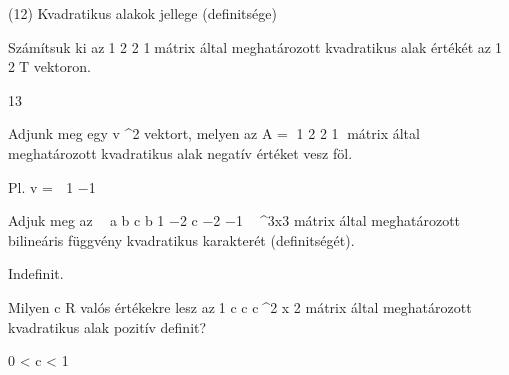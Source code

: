 \begin{frame}[plain]
\begin{tcolorbox}[center, colback={myyellow}, coltext={black}, colframe={myyellow}]
    {\RHuge  (12) Kvadratikus alakok jellege (deﬁnitsége)}
    \mmedskip
\end{tcolorbox}
\end{frame}

\begin{frame}
  \begin{tcolorbox}[title={12/1. -N-}]
     Számítsuk ki az1 2 2 1mátrix által meghatározott kvadratikus alak értékét az1 2T vektoron.

  \tcblower

    \mmedskip 
    
    13
  \end{tcolorbox}
\end{frame}


\begin{frame}
  \begin{tcolorbox}[title={12/2. -R-}]
     Adjunk meg egy v \in {}^2 vektort, melyen az A = 1 2 2 1 mátrix által meghatározott kvadratikus alak negatív értéket vesz föl.


  \tcblower

    \mmedskip 
    
    Pl. v =  1 −1
  \end{tcolorbox}
\end{frame}


\begin{frame}
  \begin{tcolorbox}[title={12/3. -R-}]
     Adjuk meg az 
a b c b 1 −2 c −2 −1
 \in {}^3x3 mátrix által meghatározott bilineáris függvény kvadratikus karakterét (deﬁnitségét).


  \tcblower

    \mmedskip 
    
    Indeﬁnit.
  \end{tcolorbox}
\end{frame}


\begin{frame}
  \begin{tcolorbox}[title={12/4. -N-}]
     Milyen c \in R valós értékekre lesz az1 c c c\in {}^{2 x 2} mátrix által meghatározott kvadratikus alak pozitív deﬁnit?

  \tcblower

    \mmedskip 
    
    0 < c < 1
  \end{tcolorbox}
\end{frame}


